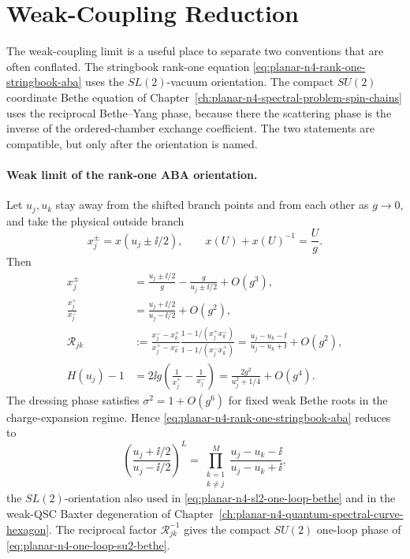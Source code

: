 \section{Weak-Coupling Reduction}

The weak-coupling limit is a useful place to separate two conventions that
are often conflated.  The stringbook rank-one equation
\eqref{eq:planar-n4-rank-one-stringbook-aba} uses the \(SL(2)\)-vacuum
orientation.  The compact \(SU(2)\) coordinate Bethe equation of
Chapter~\ref{ch:planar-n4-spectral-problem-spin-chains} uses the reciprocal
Bethe--Yang phase, because there the scattering phase is the inverse of the
ordered-chamber exchange coefficient.  The two statements are compatible,
but only after the orientation is named.

\paragraph{Weak limit of the rank-one ABA orientation.}
\label{par:planar-n4-rank-one-aba-weak-limit}
Let \(u_j,u_k\) stay away from the shifted branch points and from each other
as \(g\to0\), and take the physical outside branch
\[
  x_j^\pm=x(u_j\pm\ii/2),
  \qquad
  x(U)+x(U)^{-1}=\frac{U}{g}.
\]
Then
\begin{align}
  x_j^\pm
  &=
  \frac{u_j\pm\ii/2}{g}
  -\frac{g}{u_j\pm\ii/2}
  +O(g^3),
  \label{eq:planar-n4-xpm-weak-branch-expansion}\\
  \frac{x_j^+}{x_j^-}
  &=
  \frac{u_j+\ii/2}{u_j-\ii/2}+O(g^2),
  \label{eq:planar-n4-weak-momentum-ratio}\\
  \mathcal R_{jk}
  &:=
  \frac{x_j^- -x_k^+}{x_j^+ -x_k^-}
  \frac{1-1/(x_j^+x_k^-)}{1-1/(x_j^-x_k^+)}
  =
  \frac{u_j-u_k-\ii}{u_j-u_k+\ii}+O(g^2),
  \label{eq:planar-n4-rank-one-rational-weak-limit}\\
  H(u_j)-1
  &=
  2\ii g\left(\frac1{x_j^+}-\frac1{x_j^-}\right)
  =
  \frac{2g^2}{u_j^2+1/4}+O(g^4).
  \label{eq:planar-n4-rank-one-energy-weak-limit}
\end{align}
The dressing phase satisfies \(\sigma^2=1+O(g^6)\) for fixed weak Bethe
roots in the charge-expansion regime.  Hence
\eqref{eq:planar-n4-rank-one-stringbook-aba} reduces to
\begin{equation}
  \left(\frac{u_j+\ii/2}{u_j-\ii/2}\right)^L
  =
  \prod_{\substack{k=1\\k\neq j}}^M
  \frac{u_j-u_k-\ii}{u_j-u_k+\ii},
  \label{eq:planar-n4-rank-one-sl2-weak-bethe}
\end{equation}
the \(SL(2)\)-orientation also used in
\eqref{eq:planar-n4-sl2-one-loop-bethe} and in the weak-QSC Baxter
degeneration of Chapter~\ref{ch:planar-n4-quantum-spectral-curve-hexagon}.
The reciprocal factor \(\mathcal R_{jk}^{-1}\) gives the compact \(SU(2)\)
one-loop phase of \eqref{eq:planar-n4-one-loop-su2-bethe}.

